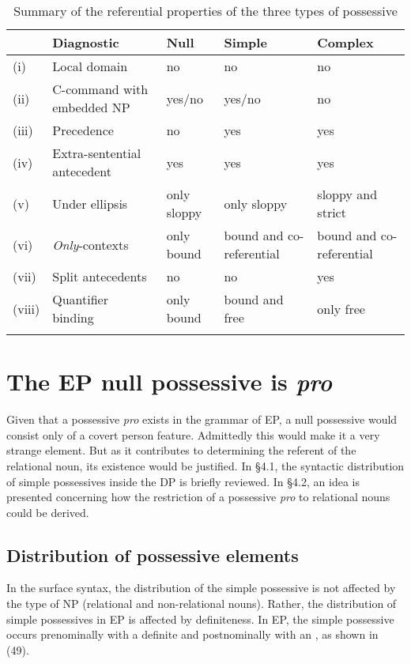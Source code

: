 \documentclass[output=paper]{langsci/langscibook}
\begin{document}
\begin{table}
\begin{tabularx}{\textwidth}{lQQQQ} 
\lsptoprule
& {Diagnostic} & {Null} & {Simple} & {Complex}\\\midrule
(i) & Local domain & no & no & no\\
(ii) & C-command with embedded NP & yes/no & yes/no & no\\
(iii) & Precedence & no & yes & yes\\
(iv) & Extra-sentential antecedent & yes & yes & yes\\
(v) & Under ellipsis & only sloppy & only sloppy & sloppy and strict\\
(vi) & \textit{Only}{}-contexts & only bound & bound and co-referential & bound and co-referential\\
(vii) & Split antecedents & no & no & yes\\
(viii) & Quantifier binding & only bound & bound and free & only free\\
\lspbottomrule
\end{tabularx}
\caption{Summary of the referential properties of the three types of possessive}
\label{tab:wein:2}
\end{table}

\section{The EP null possessive is \textit{pro}}%

Given that a possessive \textit{pro} exists in the grammar of EP, a null possessive would consist only of a covert person feature. Admittedly this would make it a very strange element. But as it contributes to determining the referent of the relational noun, its existence would be justified. In §4.1, the syntactic distribution of simple possessives inside the DP is briefly reviewed. In §4.2, an idea is presented concerning how the restriction of a possessive \textit{pro} to relational nouns could be derived.

\subsection{Distribution of possessive elements}%

In the surface syntax, the distribution of the simple possessive is not affected by the type of NP (relational and non-relational nouns). Rather, the distribution of simple possessives in EP is affected by definiteness. In EP, the simple possessive occurs prenominally with a definite  and postnominally with an  , as shown in (49).
\end{document}
